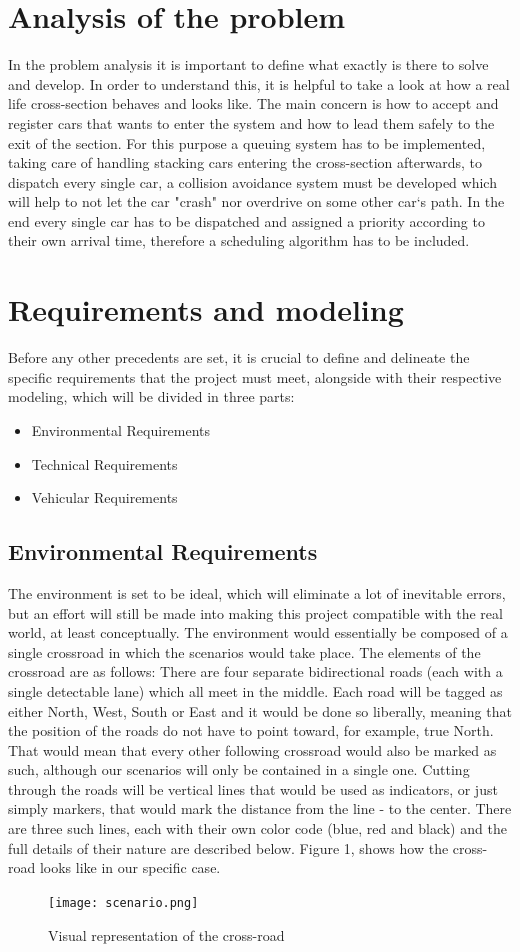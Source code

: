\documentclass[conference]{IEEEtran}
\begin{document}
\section{Analysis of the problem}
In the problem analysis it is important to define what exactly is there to solve and develop. In order to understand this, it is helpful to take a look at how a real life cross-section behaves and looks like. The main concern is how to accept and register cars that wants to enter the system and how to lead them safely to the exit of the section. For this purpose a queuing system has to be implemented, taking care of handling stacking cars entering the cross-section afterwards, to dispatch every single car, a collision avoidance system must be developed which will help to not let the car "crash" nor overdrive on some other car`s path. In the end every single car has to be dispatched and assigned a priority according to their own arrival time, therefore a scheduling algorithm has to be included.

\section{Requirements and modeling}
Before any other precedents are set, it is crucial to define and delineate the specific requirements that the project must meet, alongside with their respective modeling, which will be divided in three parts:
\begin{itemize}
	\item Environmental Requirements
	\item Technical Requirements
	\item Vehicular Requirements
\end{itemize} 

\subsection {Environmental Requirements}
The environment is set to be ideal, which will eliminate a lot of inevitable errors, but an effort will still be made into making this project compatible with the real world, at least conceptually. The environment would essentially be composed of a single crossroad in which the scenarios would take place. The elements of the crossroad are as follows: There are four separate bidirectional roads (each with a single detectable lane) which all meet in the middle. Each road will be tagged as  either North, West, South or East and it would be done so liberally, meaning that the position of the roads do not have to point toward, for example, true North. That would mean that every other following crossroad would also be marked as such, although our scenarios will only be contained in a single one. Cutting through the roads will be vertical lines that would be used as indicators, or just simply markers, that would mark the distance from the line - to the center. There are three such lines, each with their own color code (blue, red and black) and the full details of their nature are described below. Figure 1, shows how the cross-road looks like in our specific case.
\begin{figure}[h!]
	\centerline{\texttt{[image: scenario.png]}}
	\caption{Visual representation of the cross-road}
\end{figure}
\end{document}
